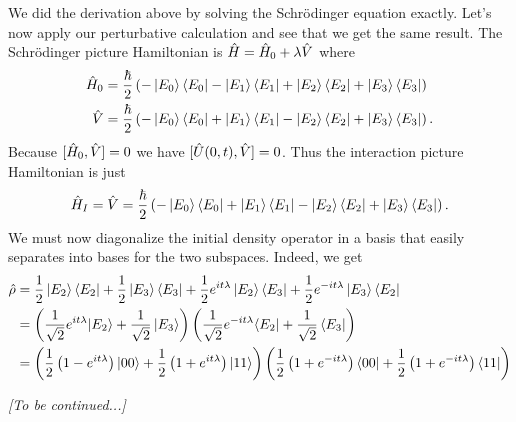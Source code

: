 We did the derivation above by solving the Schr\"odinger equation exactly. Let's now apply our perturbative calculation and see that we get the same result. The Schr\"odinger picture Hamiltonian is \(\hat{H} = \hat{H}_0 + \lambda \hat{V}\) where
\begin{align*}
\hat{H}_0 &= \frac{\hbar}{2} \left(-\left|E_0\right\rangle\left\langle E_0\right| - \left|E_1\right\rangle\left\langle E_1\right| + \left|E_2\right\rangle\left\langle E_2\right| + \left|E_3\right\rangle\left\langle E_3\right|\right) \\
\hat{V} &= \frac{\hbar}{2} \left(-\left|E_0\right\rangle\left\langle E_0\right| + \left|E_1\right\rangle\left\langle E_1\right| - \left|E_2\right\rangle\left\langle E_2\right| + \left|E_3\right\rangle\left\langle E_3\right|\right).
\end{align*}
Because \([\hat{H}_0, \hat{V}] = 0\) we have \([\hat{U}(0, t), \hat{V}] = 0\). Thus the interaction picture Hamiltonian is just
\[\hat{H}_I = \hat{V} = \frac{\hbar}{2} \left(-\left|E_0\right\rangle\left\langle E_0\right| + \left|E_1\right\rangle\left\langle E_1\right| - \left|E_2\right\rangle\left\langle E_2\right| + \left|E_3\right\rangle\left\langle E_3\right|\right).\]
We must now diagonalize the initial density operator in a basis that easily separates into bases for the two subspaces. Indeed, we get
\begin{align*}
\hat{\rho} &= \frac{1}{2}\left|E_2\right\rangle\left\langle E_2\right| + \frac{1}{2}\left|E_3\right\rangle\left\langle E_3\right| + \frac{1}{2} e^{it\lambda} \left|E_2\right\rangle\left\langle E_3\right| + \frac{1}{2} e^{-it\lambda} \left|E_3\right\rangle\left\langle E_2\right| \\
&= \left(\frac{1}{\sqrt{2}} e^{it\lambda}{\left|E_2\right\rangle} + \frac{1}{\sqrt{2}}\left|E_3\right\rangle\right) \left(\frac{1}{\sqrt{2}} e^{-it\lambda}{\left\langle E_2\right|} + \frac{1}{\sqrt{2}}\left\langle E_3\right|\right) \\
&= \left(\frac{1}{2} \left(1-e^{it\lambda}\right){\left|00\right\rangle} + \frac{1}{2}\left(1+e^{it\lambda}\right)\left|11\right\rangle\right) \left(\frac{1}{2} \left(1+e^{-it\lambda}\right){\left\langle00\right|} + \frac{1}{2}\left(1+e^{-it\lambda}\right)\left\langle11\right|\right) \\
\end{align*}

\emph{[To be continued...]}
